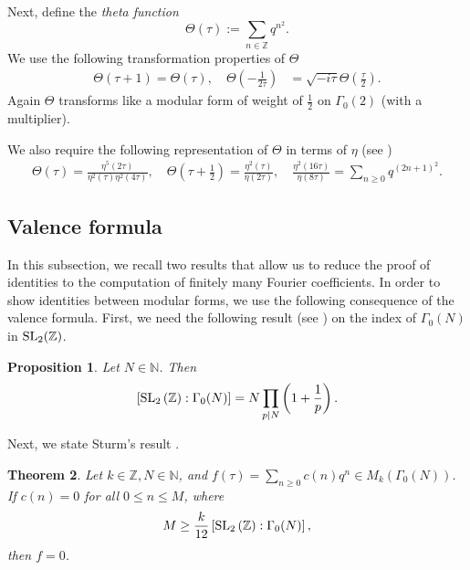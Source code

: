 \documentclass[12pt,reqno]{amsart}
\newcommand{\G}{\Gamma}
\renewcommand{\t}{\tau}
\renewcommand{\(}{\left\(}
\renewcommand{\)}{\right\)}
\numberwithin{equation}{section}
\theoremstyle{plain}
\newtheorem{theorem}{Theorem}[section]
\newtheorem{proposition}[theorem]{Proposition}
\theoremstyle{definition}
\numberwithin{equation}{section}
\begin{document}
Next, define the {\it theta function}
\begin{equation}\label{Theta}
\Theta(\t):=\sum_{n\in \mathbb{Z}}q^{n^2}.
\end{equation}
We use the following transformation properties of $\Theta$
\begin{align}\label{theta0}
\Theta(\t+1)=\Theta(\t), \quad \Theta\left(-\frac{1}{2\t}\right)&=\sqrt{-i\t}\Theta\left(\frac{\t}{2}\right).
\end{align}
Again $\Theta$ transforms like a modular form of weight of $\frac 12$ on $\G_0(2)$ (with a multiplier).

We also require the following representation of $\Theta$ in terms of $\eta$ (see \cite[Theorem 1.60]{Ono})
\begin{align}\label{ONO}
\Theta(\t)=\frac{\eta^5(2\t)}{\eta^2(\t)\eta^2(4\t)},\quad \Theta\left(\t+\frac 12\right)=\frac{\eta^2(\t)}{\eta(2\t)},\quad \frac{\eta^2\left(16\t\right)}{\eta\left(8\t\right)}=\sum_{n\ge 0}q^{(2n+1)^2}.
\end{align}








\subsection{Valence formula} In this subsection, we recall two results that allow us to reduce the proof of identities to the computation of finitely many Fourier coefficients. In order to show identities between modular forms, we use the following consequence of the valence formula. First, we need the following result (see \cite[Proposition 1.7]{Ono}) on the index of $\G_0(N)$ in $\textnormal{SL}_2(\mathbb{Z})$.
\begin{proposition}\label{Onoprop}
	Let $N\in \mathbb{N}$. Then
	\[
	\left[\textnormal{SL}_2\left(\mathbb{Z}\right):\G_0(N)\right]=N\prod_{p\mid N}\left(1+\frac 1p\right).
	\]
\end{proposition}

Next, we state Sturm's result \cite{St}.
\begin{theorem}\label{Sturm}
	Let $k\in \mathbb{Z}, N\in \mathbb{N}$, and $f(\t)=\sum_{n\ge 0}c(n)q^n\in M_k(\G_0(N))$. If $c(n)=0$ for all $0\le n\le M$, where
	\[
	M\ge \frac{k}{12}\left[\textnormal{SL}_2\left(\mathbb{Z}\right):\G_0(N)\right],
	\]
	then $f= 0$.
\end{theorem}
\end{document}
